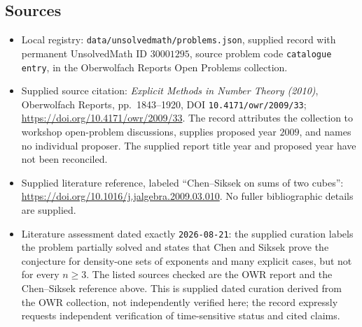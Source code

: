 \documentclass[11pt]{article}
\begin{document}
\subsection{Sources}
\begin{itemize}
\item Local registry: \texttt{data/unsolvedmath/problems.json}, supplied record with permanent UnsolvedMath ID \(30001295\), source problem code \texttt{catalogue entry}, in the Oberwolfach Reports Open Problems collection.
\item Supplied source citation: \emph{Explicit Methods in Number Theory (2010)}, Oberwolfach Reports, pp.~1843--1920, DOI \texttt{10.4171/owr/2009/33}; \url{https://doi.org/10.4171/owr/2009/33}. The record attributes the collection to workshop open-problem discussions, supplies proposed year \(2009\), and names no individual proposer. The supplied report title year and proposed year have not been reconciled.
\item Supplied literature reference, labeled ``Chen--Siksek on sums of two cubes'': \url{https://doi.org/10.1016/j.jalgebra.2009.03.010}. No fuller bibliographic details are supplied.
\item Literature assessment dated exactly \texttt{2026-08-21}: the supplied curation labels the problem partially solved and states that Chen and Siksek prove the conjecture for density-one sets of exponents and many explicit cases, but not for every \(n\geq 3\). The listed sources checked are the OWR report and the Chen--Siksek reference above. This is supplied dated curation derived from the OWR collection, not independently verified here; the record expressly requests independent verification of time-sensitive status and cited claims.
\end{itemize}
\end{document}
